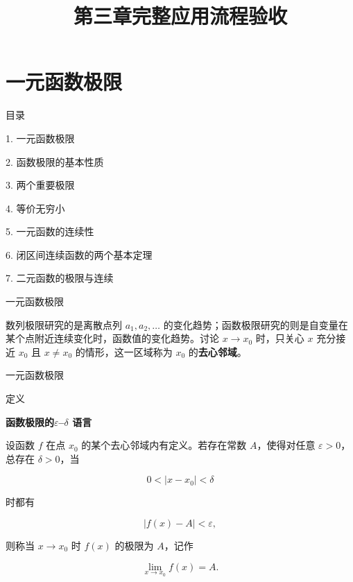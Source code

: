 \documentclass[aspectratio=169,10pt,fontset=fandol]{ctexbeamer}
\title{第三章完整应用流程验收}
\begin{document}
\section{一元函数极限}
\begin{frame}[t,fragile]{目录}
\normalsize
{\color{blue}\normalsize 1. 一元函数极限\par}\vspace{0.22em}
{\color{gray!40}\normalsize 2. 函数极限的基本性质\par}\vspace{0.22em}
{\color{gray!40}\normalsize 3. 两个重要极限\par}\vspace{0.22em}
{\color{gray!40}\normalsize 4. 等价无穷小\par}\vspace{0.22em}
{\color{gray!40}\normalsize 5. 一元函数的连续性\par}\vspace{0.22em}
{\color{gray!40}\normalsize 6. 闭区间连续函数的两个基本定理\par}\vspace{0.22em}
{\color{gray!40}\normalsize 7. 二元函数的极限与连续\par}\vspace{0.22em}
\end{frame}
\begin{frame}[t,fragile]{一元函数极限}
\normalsize
{\normalsize
数列极限研究的是离散点列 \(a_1,a_2,\ldots\) 的变化趋势；函数极限研究的则是自变量在某个点附近连续变化时，函数值的变化趋势。讨论 \(x\to x_0\) 时，只关心 \(x\) 充分接近 \(x_0\) 且 \(x\neq x_0\) 的情形，这一区域称为 \(x_0\) 的\textbf{去心邻域}。




}
\end{frame}
\begin{frame}[t,fragile]{一元函数极限}
\normalsize
\begin{block}{定义}
{\normalsize
\textbf{函数极限的\(\varepsilon\)--\(\delta\) 语言}\par


设函数 \(f\) 在点 \(x_0\) 的某个去心邻域内有定义。若存在常数 \(A\)，使得对任意 \(\varepsilon>0\)，总存在 \(\delta>0\)，当

\[

0<|x-x_0|<\delta

\]

时都有

\[

|f(x)-A|<\varepsilon,

\]

则称当 \(x\to x_0\) 时 \(f(x)\) 的极限为 \(A\)，记作

\[

\lim_{x\to x_0}f(x)=A.

\]


}
\end{block}
\end{frame}
\end{document}
